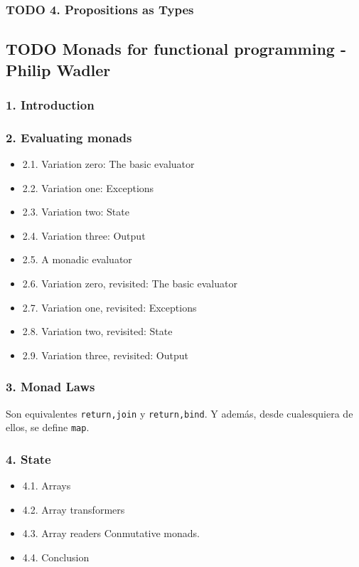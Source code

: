 \documentclass[11pt]{article}
\begin{document}
\subsubsection*{{\bfseries\sffamily TODO} 4. Propositions as Types}
\label{sec-1-1-4}
\subsection*{{\bfseries\sffamily TODO} Monads for functional programming - Philip Wadler}
\label{sec-1-2}
\subsubsection*{1. Introduction}
\label{sec-1-2-1}
\subsubsection*{2. Evaluating monads}
\label{sec-1-2-2}
\begin{itemize}
\item 2.1. Variation zero: The basic evaluator
\label{sec-1-2-2-1}
\item 2.2. Variation one: Exceptions
\label{sec-1-2-2-2}
\item 2.3. Variation two: State
\label{sec-1-2-2-3}
\item 2.4. Variation three: Output
\label{sec-1-2-2-4}
\item 2.5. A monadic evaluator
\label{sec-1-2-2-5}
\item 2.6. Variation zero, revisited: The basic evaluator
\label{sec-1-2-2-6}
\item 2.7. Variation one, revisited: Exceptions
\label{sec-1-2-2-7}
\item 2.8. Variation two, revisited: State
\label{sec-1-2-2-8}
\item 2.9. Variation three, revisited: Output
\label{sec-1-2-2-9}
\end{itemize}
\subsubsection*{3. Monad Laws}
\label{sec-1-2-3}
Son equivalentes \texttt{return,join} y \texttt{return,bind}. Y además, desde cualesquiera
de ellos, se define \texttt{map}.
\subsubsection*{4. State}
\label{sec-1-2-4}
\begin{itemize}
\item 4.1. Arrays
\label{sec-1-2-4-1}
\item 4.2. Array transformers
\label{sec-1-2-4-2}
\item 4.3. Array readers
\label{sec-1-2-4-3}
Conmutative monads.
\item 4.4. Conclusion
\label{sec-1-2-4-4}
\end{itemize}
\end{document}
